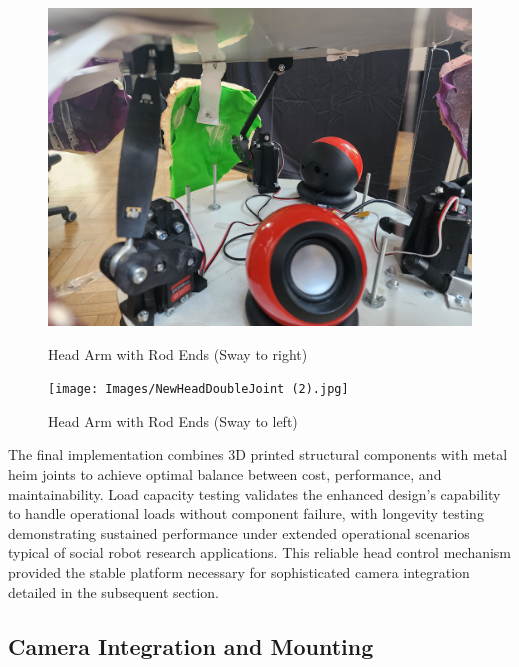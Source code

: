 \begin{figure}[H]
    \centering
    \begin{minipage}{0.45\textwidth}
        \centering
        \includegraphics[width=\textwidth]{Images/NewHeadDoubleJoint (6).jpg}
        \caption{Head Arm with Rod Ends (Sway to right)}
        \label{fig:head_arm_rod_end_right}
    \end{minipage}
    \hfill
    \begin{minipage}{0.45\textwidth}
        \centering
        \texttt{[image: Images/NewHeadDoubleJoint (2).jpg]}
        \caption{Head Arm with Rod Ends (Sway to left)}
        \label{fig:head_arm_rod_end_left}
    \end{minipage}
\end{figure}

The final implementation combines 3D printed structural components with metal heim joints to achieve optimal balance between cost, performance, and maintainability. Load capacity testing validates the enhanced design's capability to handle operational loads without component failure, with longevity testing demonstrating sustained performance under extended operational scenarios typical of social robot research applications. This reliable head control mechanism provided the stable platform necessary for sophisticated camera integration detailed in the subsequent section.

\subsection{Camera Integration and Mounting}

